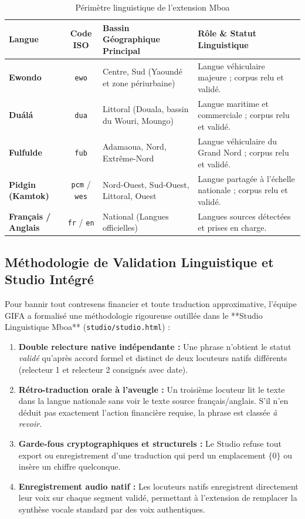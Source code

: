 \documentclass[10pt,a4paper]{article}
\begin{document}
\begin{table}[h]
\centering
\small
\begin{tabularx}{\textwidth}{lcp{4.5cm}X}
\toprule
\textbf{Langue} & \textbf{Code ISO} & \textbf{Bassin Géographique Principal} & \textbf{Rôle \& Statut Linguistique} \\
\midrule
\textbf{Ewondo} & \texttt{ewo} & Centre, Sud (Yaoundé et zone périurbaine) & Langue véhiculaire majeure ; corpus relu et validé. \\
\textbf{Duálá} & \texttt{dua} & Littoral (Douala, bassin du Wouri, Moungo) & Langue maritime et commerciale ; corpus relu et validé. \\
\textbf{Fulfulde} & \texttt{fub} & Adamaoua, Nord, Extrême-Nord & Langue véhiculaire du Grand Nord ; corpus relu et validé. \\
\textbf{Pidgin (Kamtok)} & \texttt{pcm} / \texttt{wes} & Nord-Ouest, Sud-Ouest, Littoral, Ouest & Langue partagée à l'échelle nationale ; corpus relu et validé. \\
\textbf{Français / Anglais} & \texttt{fr} / \texttt{en} & National (Langues officielles) & Langues sources détectées et prises en charge. \\
\bottomrule
\end{tabularx}
\caption{Périmètre linguistique de l'extension Mboa}
\end{table}

\subsection{Méthodologie de Validation Linguistique et Studio Intégré}
Pour bannir tout contresens financier et toute traduction approximative, l'équipe GIFA a formalisé une méthodologie rigoureuse outillée dans le **Studio Linguistique Mboa** (\texttt{studio/studio.html}) :
\begin{enumerate}
  \item \textbf{Double relecture native indépendante :} Une phrase n'obtient le statut \textit{validé} qu'après accord formel et distinct de deux locuteurs natifs différents (relecteur 1 et relecteur 2 consignés avec date).
  \item \textbf{Rétro-traduction orale à l'aveugle :} Un troisième locuteur lit le texte dans la langue nationale sans voir le texte source français/anglais. S'il n'en déduit pas exactement l'action financière requise, la phrase est classée \textit{à revoir}.
  \item \textbf{Garde-fous cryptographiques et structurels :} Le Studio refuse tout export ou enregistrement d'une traduction qui perd un emplacement $\{0\}$ ou insère un chiffre quelconque.
  \item \textbf{Enregistrement audio natif :} Les locuteurs natifs enregistrent directement leur voix sur chaque segment validé, permettant à l'extension de remplacer la synthèse vocale standard par des voix authentiques.
\end{enumerate}
\end{document}
